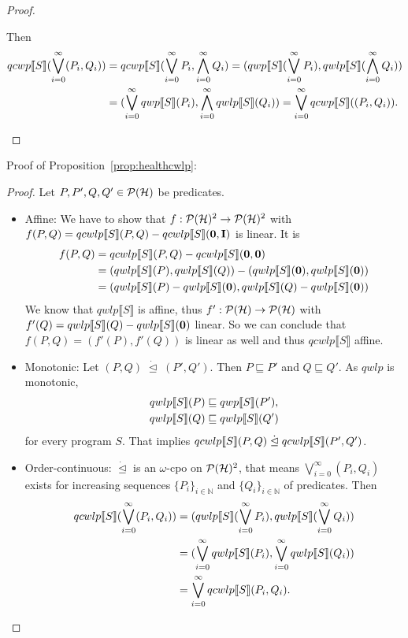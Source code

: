 \documentclass[a4paper,UKenglish,cleveref, autoref, thm-restate]{lipics-v2021}
\begin{document}
\begin{proof}
\begin{itemize}
    Then
    \begin{align*}
        qcwp\llbracket S \rrbracket (\bigvee_{i=0}^\infty (P_i,Q_i)) &= qcwp\llbracket S \rrbracket (\bigvee_{i=0}^\infty P_i ,\bigwedge_{i=0}^\infty Q_i)= (qwp\llbracket S \rrbracket (\bigvee_{i=0}^\infty P_i ), qwlp\llbracket S \rrbracket (\bigwedge_{i=0}^\infty Q_i))\\
        &= (\bigvee_{i=0}^\infty qwp\llbracket S \rrbracket ( P_i ), \bigwedge_{i=0}^\infty qwlp\llbracket S \rrbracket (Q_i))= \bigvee_{i=0}^\infty qcwp\llbracket S \rrbracket ((P_i,Q_i)).
    \end{align*}
    \end{itemize}
\end{proof}


Proof of Proposition~\ref{prop:healthcwlp}:
\begin{proof}
    Let $P,P',Q,Q' \in \mathcal{P}(\mathcal{H})$ be predicates.
    \begin{itemize}
        \item Affine: We have to show that $f:\mathcal{P}(\mathcal{H})^2 \to \mathcal{P}(\mathcal{H})^2$ with $f(P,Q)=qcwlp\llbracket S \rrbracket (P,Q) - qcwlp\llbracket S \rrbracket (\mathbf{0},\textbf{I})$ is linear.
        It is \begin{align*}
            f(P,Q) &= qcwlp\llbracket S \rrbracket (P,Q) - qcwlp\llbracket S \rrbracket (\mathbf{0},\mathbf{0}) \\
            &= (qwlp\llbracket S \rrbracket (P),qwlp\llbracket S \rrbracket (Q))-(qwlp\llbracket S \rrbracket (\mathbf{0}),qwlp\llbracket S \rrbracket (\mathbf{0}))\\
            &= (qwlp\llbracket S \rrbracket (P)-qwlp\llbracket S \rrbracket (\mathbf{0}),qwlp\llbracket S \rrbracket (Q)-qwlp\llbracket S \rrbracket (\mathbf{0}))
        \end{align*}
        We know that $qwlp\llbracket S \rrbracket$ is affine, thus $f':\mathcal{P}(\mathcal{H}) \to \mathcal{P}(\mathcal{H})$ with $f'(Q)=qwlp\llbracket S \rrbracket (Q)-qwlp\llbracket S \rrbracket (\mathbf{0})$ linear. So we can conclude that
        $f(P,Q)=(f'(P), f'(Q))$ is linear as well and thus $qcwlp\llbracket S \rrbracket $ affine.
\item Monotonic: Let $(P,Q) \phantom{.}\dot \unlhd \phantom{.} (P',Q')$. Then $P \sqsubseteq P'$ and $Q \sqsubseteq Q'$. As $qwlp$ is monotonic,
        \begin{align*}
            qwlp\llbracket S \rrbracket (P) &\sqsubseteq qwp\llbracket S \rrbracket (P'),\\
            qwlp\llbracket S \rrbracket (Q) &\sqsubseteq qwlp\llbracket S \rrbracket (Q')
        \end{align*}
        for every program $S$. That implies $
            qcwlp\llbracket S \rrbracket (P,Q) \phantom{.}\dot \unlhd \phantom{.} qcwlp\llbracket S \rrbracket (P',Q')$.

        \item Order-continuous: $\dot \unlhd$ is an $\omega$-cpo on $\mathcal{P}(\mathcal{H})^2$, that means $\bigvee_{i=0}^\infty (P_i,Q_i)$ exists for increasing sequences $\{P_i\}_{i \in \mathbb{N}}$ and $\{Q_i\}_{i\in \mathbb{N}}$ of predicates.
        Then
        \begin{align*}
            qcwlp\llbracket S \rrbracket (\bigvee_{i=0}^\infty (P_i,Q_i)) &= (qwlp\llbracket S \rrbracket (\bigvee_{i=0}^\infty P_i ), qwlp\llbracket S \rrbracket (\bigvee_{i=0}^\infty  Q_i)) \\
            &= (\bigvee_{i=0}^\infty qwlp\llbracket S \rrbracket ( P_i ),\bigvee_{i=0}^\infty  qwlp\llbracket S \rrbracket ( Q_i)) \\
            &= \bigvee_{i=0}^\infty qcwlp\llbracket S \rrbracket ( P_i,Q_i).
        \end{align*}
    \end{itemize}
\end{proof}
\end{document}
